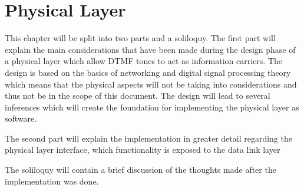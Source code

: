 \chapter{Physical Layer}
This chapter will be split into two parts and a soliloquy. The first part will
explain the main considerations that have been made during the design phase of
a physical layer which allow DTMF tones to act as information carriers.
The design is based on the basics of networking and digital signal processing
theory which means that the physical aspects will not be taking into considerations
and thus not be in the scope of this document. The design will lead to several
inferences which will create the foundation for implementing the physical layer as software.

The second part will explain the implementation in greater detail regarding the physical layer
interface, which functionality is exposed to the data link layer 

The soliloquy will contain a brief discussion of the thoughts made after the implementation
was done.

